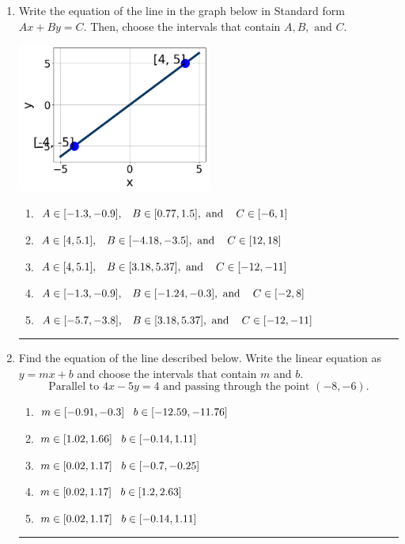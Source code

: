 \documentclass[14pt]{extbook}
\newcommand{\litem}[1]{\item#1\hspace*{-1cm}\rule{\textwidth}{0.4pt}}
\begin{document}
\begin{enumerate}
{\begin{enumerate}[label=\Alph*.]
\end{enumerate} }
\litem{
Write the equation of the line in the graph below in Standard form $Ax+By=C$. Then, choose the intervals that contain $A, B, \text{ and } C$.
\begin{center}
    \includegraphics[width=0.5\textwidth]{../Figures/linearGraphToStandardC.png}
\end{center}
\begin{enumerate}[label=\Alph*.]
\item \( A \in [-1.3, -0.9], \hspace{3mm} B \in [0.77, 1.5], \text{ and } \hspace{3mm} C \in [-6, 1] \)
\item \( A \in [4, 5.1], \hspace{3mm} B \in [-4.18, -3.5], \text{ and } \hspace{3mm} C \in [12, 18] \)
\item \( A \in [4, 5.1], \hspace{3mm} B \in [3.18, 5.37], \text{ and } \hspace{3mm} C \in [-12, -11] \)
\item \( A \in [-1.3, -0.9], \hspace{3mm} B \in [-1.24, -0.3], \text{ and } \hspace{3mm} C \in [-2, 8] \)
\item \( A \in [-5.7, -3.8], \hspace{3mm} B \in [3.18, 5.37], \text{ and } \hspace{3mm} C \in [-12, -11] \)

\end{enumerate} }
\litem{
Find the equation of the line described below. Write the linear equation as $ y=mx+b $ and choose the intervals that contain $m$ and $b$.\[ \text{Parallel to } 4 x - 5 y = 4 \text{ and passing through the point } (-8, -6). \]\begin{enumerate}[label=\Alph*.]
\item \( m \in [-0.91, -0.3] \hspace*{3mm} b \in [-12.59, -11.76] \)
\item \( m \in [1.02, 1.66] \hspace*{3mm} b \in [-0.14, 1.11] \)
\item \( m \in [0.02, 1.17] \hspace*{3mm} b \in [-0.7, -0.25] \)
\item \( m \in [0.02, 1.17] \hspace*{3mm} b \in [1.2, 2.63] \)
\item \( m \in [0.02, 1.17] \hspace*{3mm} b \in [-0.14, 1.11] \)


\end{enumerate}}
\end{enumerate}
\end{document}

